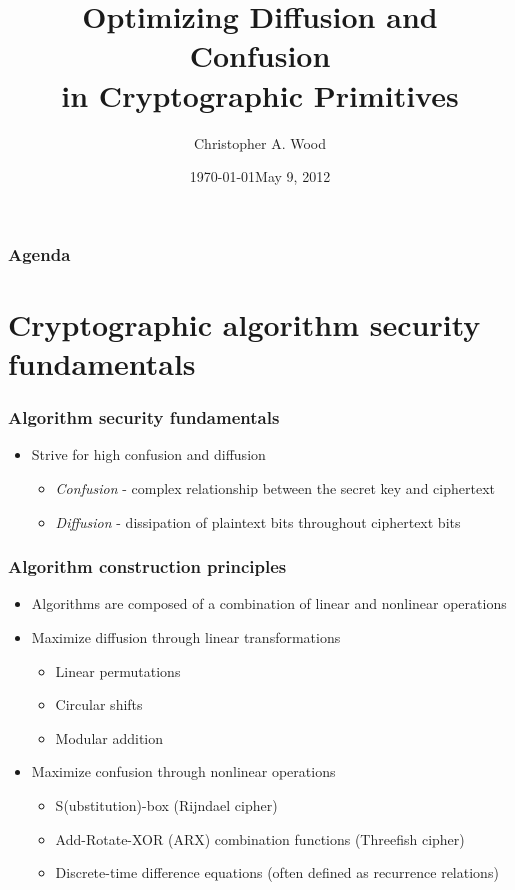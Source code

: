 \documentclass[handout]{beamer}
\title[Optimizing Diffusion and Confusion]{Optimizing Diffusion and Confusion \\ in Cryptographic Primitives}
\institute[RIT]{}
\date{\today}
\author{Christopher A. Wood}
\date{May 9, 2012}
\begin{document}

\begin{frame}
	\titlepage
\end{frame}

\begin{frame}
	\frametitle{Agenda}
	\tableofcontents
\end{frame}

\section{Cryptographic algorithm security fundamentals}
\begin{frame}
	\frametitle{Algorithm security fundamentals}
	\begin{itemize}
		\item Strive for high confusion and diffusion
		\begin{itemize}
			\item \emph{Confusion} - complex relationship between the secret key and ciphertext
			\item \emph{Diffusion} - dissipation of plaintext bits throughout ciphertext bits
		\end{itemize}
	\end{itemize}
\end{frame}

\begin{frame}
	\frametitle{Algorithm construction principles}
	\begin{itemize}
		\item Algorithms are composed of a combination of linear and nonlinear operations
		\item Maximize diffusion through linear transformations
		\begin{itemize}
			\item Linear permutations
			\item Circular shifts
			\item Modular addition 
		\end{itemize}
		\item Maximize confusion through nonlinear operations
		\begin{itemize}
			\item S(ubstitution)-box (Rijndael cipher)
			\item Add-Rotate-XOR (ARX) combination functions (Threefish cipher)
			\item Discrete-time difference equations (often defined as recurrence relations)
		\end{itemize}
	\end{itemize}
\end{frame}
\end{document}
